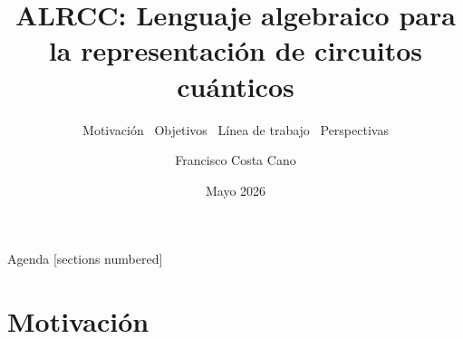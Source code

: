 \documentclass[12pt, aspectratio=169]{beamer}
\title{ALRCC: Lenguaje algebraico para la representación de circuitos cuánticos}
\subtitle{Motivación \textbullet\ Objetivos \textbullet\ Línea de trabajo \textbullet\ Perspectivas}
\author{Francisco Costa Cano}
\institute{Universidad Internacional de La Rioja (UNIR)}
\date{Mayo 2026}
\begin{document}

{
\begin{frame}[noframenumbering]
  \titlepage
\end{frame}
}

\begin{frame}{Agenda}
  [sections numbered]
  \tableofcontents[hideallsubsections]
\end{frame}

\section{Motivación}
\end{document}
